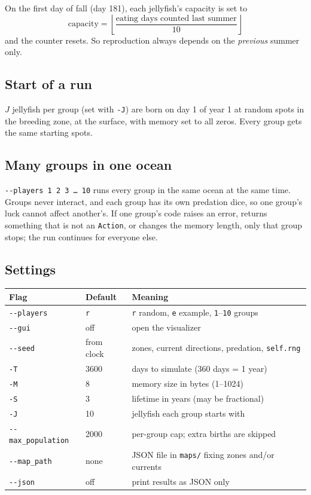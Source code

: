 \documentclass[11pt]{article}
\begin{document}
On the first day of fall (day 181), each jellyfish's capacity is set to
\[
  \mbox{capacity} = \left\lfloor \frac{\mbox{eating days counted last summer}}{10} \right\rfloor
\]
and the counter resets. So reproduction always depends on the \emph{previous}
summer only.

\subsection{Start of a run}
$J$ jellyfish per group (set with \texttt{-J}) are born on day 1 of
year 1 at random spots in the breeding zone, at the surface, with memory
set to all zeros. Every group gets the same starting spots.

\subsection{Many groups in one ocean}
\texttt{-{}-players 1 2 3 \dots{} 10} runs every group in the same ocean at
the same time. Groups never interact, and each group has its own
predation dice, so one group's luck cannot affect another's. If one
group's code raises an error, returns something that is not an
\texttt{Action}, or changes the memory length, only that group stops; the
run continues for everyone else.

\subsection{Settings}

\begin{tabular}{@{}lll@{}}
\toprule
\textbf{Flag} & \textbf{Default} & \textbf{Meaning} \\
\midrule
\texttt{-{}-players} & \texttt{r} & \texttt{r} random, \texttt{e} example, \texttt{1}--\texttt{10} groups \\
\texttt{-{}-gui} & off & open the visualizer \\
\texttt{-{}-seed} & from clock & zones, current directions, predation, \texttt{self.rng} \\
\texttt{-T} & 3600 & days to simulate (360 days = 1 year) \\
\texttt{-M} & 8 & memory size in bytes (1--1024) \\
\texttt{-S} & 3 & lifetime in years (may be fractional) \\
\texttt{-J} & 10 & jellyfish each group starts with \\
\texttt{-{}-max\_population} & 2000 & per-group cap; extra births are skipped \\
\texttt{-{}-map\_path} & none & JSON file in \texttt{maps/} fixing zones and/or currents \\
\texttt{-{}-json} & off & print results as JSON only \\
\bottomrule
\end{tabular}
\end{document}
